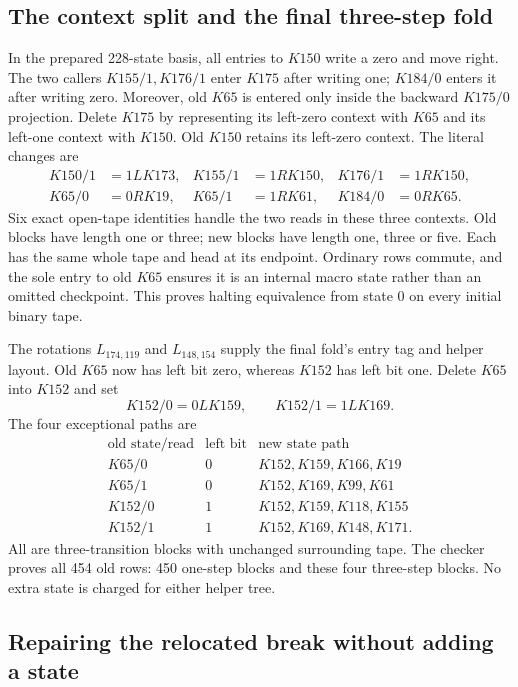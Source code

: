 \subsection{The context split and the final three-step fold}

In the prepared 228-state basis, all entries to $K150$ write a zero
and move right.  The two callers $K155/1,K176/1$ enter $K175$ after
writing one; $K184/0$ enters it after writing zero.  Moreover, old $K65$
is entered only inside the backward $K175/0$ projection.
Delete $K175$ by representing its left-zero context with $K65$ and its
left-one context with $K150$.  Old $K150$ retains its left-zero context.
The literal changes are
\[
\begin{aligned}
 K150/1&=1LK173,& K155/1&=1RK150,& K176/1&=1RK150,\\
 K65/0&=0RK19,& K65/1&=1RK61,& K184/0&=0RK65.
\end{aligned}
\]
Six exact open-tape identities handle the two reads in these three
contexts.  Old blocks have length one or three; new blocks have length
one, three or five.  Each has the same whole tape and head at its
endpoint.  Ordinary rows commute, and the sole entry to old $K65$
ensures it is an internal macro state rather than an omitted checkpoint.
This proves halting equivalence from state 0 on every initial binary tape.

The rotations $L_{174,119}$ and $L_{148,154}$ supply the final fold's
entry tag and helper layout.  Old $K65$ now has left bit zero, whereas
$K152$ has left bit one.  Delete $K65$ into $K152$ and set
\[
 K152/0=0LK159,\qquad K152/1=1LK169.
\]
The four exceptional paths are
\[
\begin{array}{ccl}
 \text{old state/read}&\text{left bit}&\text{new state path}\\
 K65/0&0&K152,K159,K166,K19\\
 K65/1&0&K152,K169,K99,K61\\
 K152/0&1&K152,K159,K118,K155\\
 K152/1&1&K152,K169,K148,K171.
\end{array}
\]
All are three-transition blocks with unchanged surrounding tape.
The checker proves all 454 old rows: 450 one-step blocks and these four
three-step blocks.  No extra state is charged for either helper tree.

\subsection{Repairing the relocated break without adding a state}

